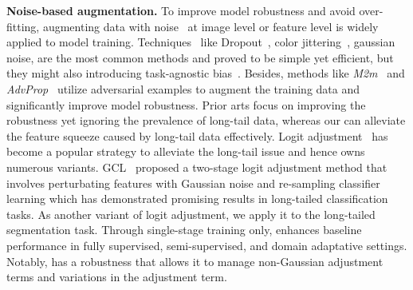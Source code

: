 %
\noindent\textbf{Noise-based augmentation.}
%
To improve model robustness and avoid over-fitting, augmenting data with noise~\cite{holmstrom1992using, bengio2011deep, ding2016convolutional} at image level or feature level is widely applied to model training.
%
Techniques~\cite{lopes2019improving,zur2009noise} like Dropout~\cite{srivastava2014dropout}, color jittering~\cite{afifi2019else}, gaussian noise, are the most common methods and proved to be simple yet efficient, but they might also introducing task-agnostic bias~\cite{yin2015noisy}.
%
Besides, methods like \textit{M2m}~\cite{kim2020m2m} and \textit{AdvProp}~\cite{xie2020adversarial} utilize adversarial examples to augment the training data and significantly improve model robustness.
%
Prior arts focus on improving the robustness yet ignoring the prevalence of long-tail data,
%
whereas our \method can alleviate the feature squeeze caused by long-tail data effectively.
%
Logit adjustment~\cite{menon2021long} has become a popular strategy to alleviate the long-tail issue and hence owns numerous variants.
%
GCL~\cite{li2022long} proposed a two-stage logit adjustment method that involves perturbating features with Gaussian noise and re-sampling classifier learning which has demonstrated promising results in long-tailed classification tasks.
%
As another variant of logit adjustment, we apply it to the long-tailed segmentation task. Through single-stage training only, \method enhances baseline performance in fully supervised, semi-supervised, and domain adaptative settings. Notably, \method has a robustness that allows it to manage non-Gaussian adjustment terms and variations in the adjustment term.
